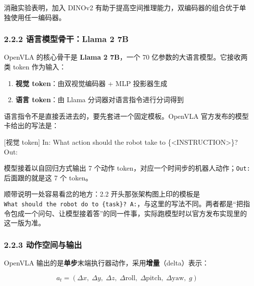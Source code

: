 \documentclass[
  chinese,
]{ctexart}
\newenvironment{Shaded}{\begin{snugshade}}{\end{snugshade}}
\newcommand{\NormalTok}[1]{\textcolor[rgb]{0.00,0.23,0.31}{#1}}
\providecommand{\tightlist}{%
  \setlength{\itemsep}{0pt}\setlength{\parskip}{0pt}}
\begin{document}
消融实验表明，加入 DINOv2
有助于提高空间推理能力，双编码器的组合优于单独使用任一编码器。

\subsubsection{2.2.2 语言模型骨干：Llama 2
7B}\label{ux8bedux8a00ux6a21ux578bux9aa8ux5e72llama-2-7b}

OpenVLA 的核心骨干是 \textbf{Llama 2 7B}，一个 70
亿参数的大语言模型。它接收两类 token 作为输入：

\begin{enumerate}
\def\labelenumi{\arabic{enumi}.}
\tightlist
\item
  \textbf{视觉 token}：由双视觉编码器 + MLP 投影器生成
\item
  \textbf{语言 token}：由 Llama 分词器对语言指令进行分词得到
\end{enumerate}

语言指令不是直接丢进去的，要先套进一个固定模板。OpenVLA
官方发布的模型卡给出的写法是：

\begin{Shaded}
\begin{Highlighting}[]
\NormalTok{[视觉 token] In: What action should the robot take to \{\textless{}INSTRUCTION\textgreater{}\}?}
\NormalTok{Out:}
\end{Highlighting}
\end{Shaded}

模型接着以自回归方式输出 7 个动作
token，对应一个时间步的机器人动作；\texttt{Out:} 后面跟的就是这 7 个
token。

顺带说明一处容易看岔的地方：2.2 开头那张架构图上印的模板是
\texttt{What\ should\ the\ robot\ do\ to\ \{task\}?\ A:}，与这里的写法不同。两者都是``把指令包成一个问句、让模型接着答''的同一件事，实际跑模型时以官方发布实现里的这一版为准。

\subsubsection{2.2.3
动作空间与输出}\label{ux52a8ux4f5cux7a7aux95f4ux4e0eux8f93ux51fa}

OpenVLA
输出的是\textbf{单步}末端执行器动作，采用\textbf{增量}（delta）表示：

\[
a_t = (\Delta x,\; \Delta y,\; \Delta z,\; \Delta \text{roll},\; \Delta \text{pitch},\; \Delta \text{yaw},\; g)
\]
\end{document}
